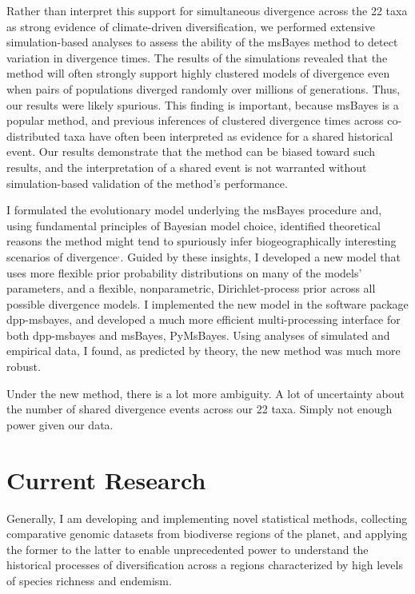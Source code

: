 \documentclass[10pt]{article}
\newcommand{\super}[1]{\ensuremath{^{\textrm{#1}}}}
\begin{document}
Rather than interpret this support for simultaneous divergence across the 22
taxa as strong evidence of climate-driven diversification, we performed
extensive simulation-based analyses to assess the ability of the msBayes method
to detect variation in divergence times.
The results of the simulations revealed that the method will often strongly
support highly clustered models of divergence even when pairs of populations
diverged randomly over millions of generations.
Thus, our results were likely spurious.
This finding is important, because msBayes is a popular method, and previous
inferences of clustered divergence times across co-distributed taxa have often
been interpreted as evidence for a shared historical event.
Our results demonstrate that the method can be biased toward such results, and
the interpretation of a shared event is not warranted without simulation-based
validation of the method's performance.

I formulated the evolutionary model underlying the msBayes procedure and, using
fundamental principles of Bayesian model choice, identified theoretical reasons
the method might tend to spuriously infer biogeographically interesting
scenarios of
divergence\super{,}.
Guided by these insights, I developed a new model that uses more flexible prior
probability distributions on many of the models' parameters, and a flexible,
nonparametric, Dirichlet-process prior across all possible divergence models.
I implemented the new model in the software package dpp-msbayes, and developed
a much more efficient multi-processing interface for both dpp-msbayes and
msBayes, PyMsBayes.
Using analyses of simulated and empirical data, I found, as predicted by theory,
the new method was much more robust.

Under the new method, there is a lot more ambiguity. A lot of uncertainty
about the number of shared divergence events across our 22 taxa. Simply not
enough power given our data.


\section*{Current Research}
Generally, I am developing and implementing novel statistical methods,
collecting comparative genomic datasets from biodiverse regions of the planet,
and applying the former to the latter to enable unprecedented power to
understand the historical processes of diversification across a regions
characterized by high levels of species richness and endemism.
\end{document}
